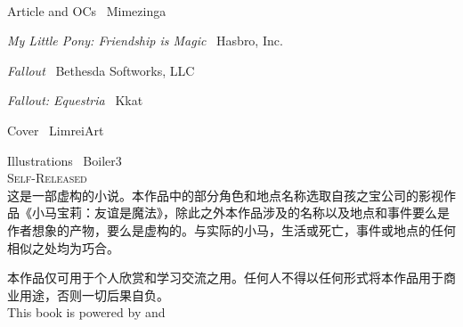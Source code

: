 \newpage

~\vfill

\thispagestyle{empty}

\noindent Article and OCs \textcopyright\ Mimezinga

\noindent \emph{My Little Pony: Friendship is Magic} \textcopyright\ Hasbro, Inc.

\noindent \emph{Fallout} \textcopyright\ Bethesda Softworks, LLC

\noindent \emph{Fallout: Equestria} \textcopyright\ Kkat

\noindent Cover \textcopyright\ LimreiArt

\noindent Illustrations \textcopyright\ Boiler3 \\

\noindent \textsc{Self-Released}\\

\noindent 这是一部虚构的小说。本作品中的部分角色和地点名称选取自孩之宝公司的影视作品《小马宝莉：友谊是魔法》，除此之外本作品涉及的名称以及地点和事件要么是作者想象的产物，要么是虚构的。与实际的小马，生活或死亡，事件或地点的任何相似之处均为巧合。

\noindent 本作品仅可用于个人欣赏和学习交流之用。任何人不得以任何形式将本作品用于商业用途，否则一切后果自负。\\

\noindent This book is powered by \XeLaTeX{} and \CTeX{}


